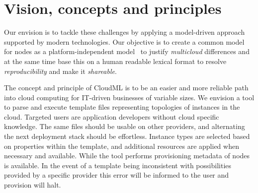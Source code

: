\chapter{Vision, concepts and principles}

Our envision is to tackle these challenges by applying a model-driven approach supported by modern technologies.
Our objective is to create a common model for nodes as a platform-independent model~\cite{agile:cuong10}
to justify \emph{multicloud} differences and 
at the same time base this on a human readable lexical format to resolve \emph{reproducibility} and
make it \emph{shareable}.

The concept and principle of CloudML is to be an easier and more reliable
path into cloud computing for IT-driven businesses of variable sizes.
We envision a tool to parse and execute template files representing topologies
of instances in the cloud. Targeted users are application developers without
cloud specific knowledge. The same files should be usable on other providers,
and alternating the next deployment stack should be effortless.
Instance types are selected based on properties within the template,
and additional resources are applied when necessary and available.
While the tool performs provisioning metadata of nodes is available.
In the event of a template being inconsistent with possibilities 
provided by a specific provider this error will be informed 
to the user and provision will halt.

